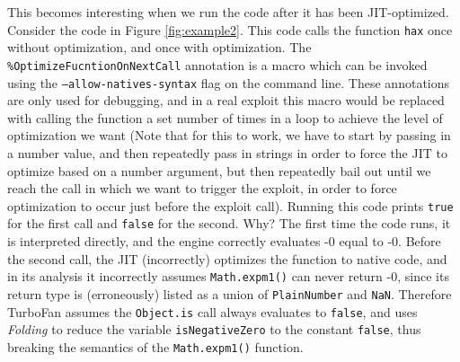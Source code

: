 \documentclass[11pt]{article}
\begin{document}
This becomes interesting when we run the code after it has been JIT-optimized. Consider the code in
Figure \ref{fig:example2}. This code calls the function \texttt{hax} once without optimization, and
once with optimization. The \texttt{\%OptimizeFucntionOnNextCall} annotation is a macro which can be
invoked using the \texttt{--allow-natives-syntax} flag on the command line. These annotations are
only used for debugging, and in a real exploit this macro would be replaced with calling the
function a set number of times in a loop to achieve the level of optimization we want (Note that for
this to work, we have to start by passing in a number value, and then repeatedly pass in strings in
order to force the JIT to optimize based on a number argument, but then repeatedly bail out until we
reach the call in which we want to trigger the exploit, in order to force optimization to occur just
before the exploit call). Running this code prints \texttt{true} for the first call and
\texttt{false} for the second. Why? The first time the code runs, it is interpreted directly, and
the engine correctly evaluates -0 equal to -0. Before the second call, the JIT (incorrectly)
optimizes the function to native code, and in its analysis it incorrectly assumes
\texttt{Math.expm1()} can never return -0, since its return type is (erroneously) listed as a union
of \texttt{PlainNumber} and \texttt{NaN}. Therefore TurboFan assumes the \texttt{Object.is} call
always evaluates to \texttt{false}, and uses \textit{Folding} to reduce the variable
\texttt{isNegativeZero} to the constant \texttt{false}, thus breaking the semantics of the
\texttt{Math.expm1()} function.
\end{document}
